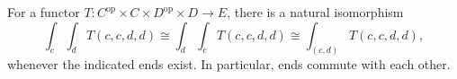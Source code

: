 For a functor $T: C^{\text{op}} \times C \times D^{\text{op}} \times D \rightarrow E$, there is a natural isomorphism
\[
\int_c \int_d T(c, c, d, d) \cong \int_d \int_c T(c, c, d, d) \cong \int_{(c,d)} T(c, c, d, d),
\]
whenever the indicated ends exist. In particular, ends commute with each other.